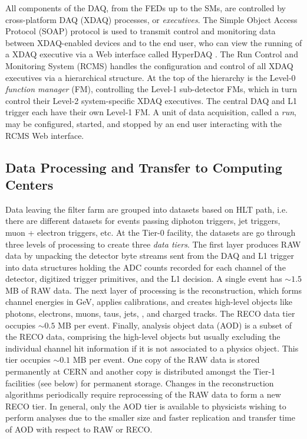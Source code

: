 \documentclass[dissertation.tex]{subfiles}
\begin{document}
All components of the DAQ, from the FEDs up to the SMs, are controlled by cross-platform DAQ (XDAQ) \cite{XDAQ} processes, or \textit{executives}.  The Simple Object Access Protocol (SOAP) \cite{SOAP} protocol is used to transmit control and monitoring data between XDAQ-enabled devices and to the end user, who can view the running of a XDAQ executive via a Web interface called HyperDAQ \cite{HyperDAQ}.  The Run Control and Monitoring System (RCMS) handles the configuration and control of all XDAQ executives via a hierarchical structure.  At the top of the hierarchy is the Level-0 \textit{function manager} (FM), controlling the Level-1 sub-detector FMs, which in turn control their Level-2 system-specific XDAQ executives.  The central DAQ and L1 trigger each have their own Level-1 FM.  A unit of data acquisition, called a \textit{run}, may be configured, started, and stopped by an end user interacting with the RCMS Web interface.

\subsection{Data Processing and Transfer to Computing Centers}
\label{sec:Data Processing and Transfer to Computing Centers}

Data leaving the filter farm are grouped into datasets based on HLT path, i.e. there are different datasets for events passing diphoton triggers, jet triggers, muon + electron triggers, etc.  At the Tier-0 facility, the datasets are go through three levels of processing to create three \textit{data tiers}.  The first layer produces RAW data by unpacking the detector byte streams sent from the DAQ and L1 trigger into data structures holding the ADC counts recorded for each channel of the detector, digitized trigger primitives, and the L1 decision.  A single event has $\sim1.5$ MB of RAW data.  The next layer of processing is the reconstruction, which forms channel energies in GeV, applies calibrations, and creates high-level objects like photons, electrons, muons, taus, jets, \MET, and charged tracks.  The RECO data tier occupies $\sim0.5$ MB per event.  Finally, analysis object data (AOD) is a subset of the RECO data, comprising the high-level objects but usually excluding the individual channel hit information if it is not associated to a physics object.  This tier occupies $\sim0.1$ MB per event.  One copy of the RAW data is stored permanently at CERN and another copy is distributed amongst the Tier-1 facilities (see below) for permanent storage.  Changes in the reconstruction algorithms periodically require reprocessing of the RAW data to form a new RECO tier.  In general, only the AOD tier is available to physicists wishing to perform analyses due to the smaller size and faster replication and transfer time of AOD with respect to RAW or RECO.
\end{document}
